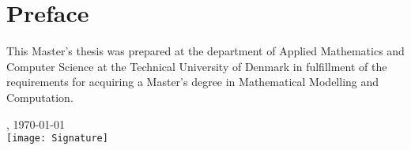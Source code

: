 \chapter{Preface}
This Master's thesis was prepared at the department of Applied Mathematics and Computer Science at the Technical University of Denmark in fulfillment of the requirements for acquiring a Master's degree in Mathematical Modelling and Computation.

\vfill

{
    \centering
    \thesislocation{}, \today\\[1cm]
    \hspace{3cm}\texttt{[image: Signature]}\\[1cm]
    \begin{flushright}
        \thesisauthor{}
    \end{flushright}
}
